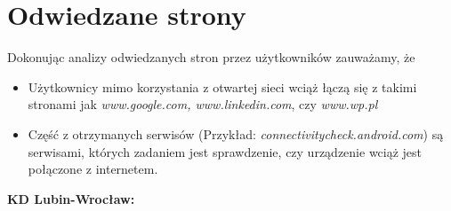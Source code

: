 \documentclass[12pt,a4paper]{article}
\begin{document}
    \section{Odwiedzane strony}
        Dokonując analizy odwiedzanych stron przez użytkowników zauważamy, że
            \begin{itemize}
                \item Użytkownicy mimo korzystania z otwartej sieci wciąż łączą się z takimi stronami jak \textit{www.google.com, www.linkedin.com}, czy \textit{www.wp.pl}
                \item Część z otrzymanych serwisów (Przykład: \textit{connectivitycheck.android.com}) są serwisami, których zadaniem jest sprawdzenie, czy urządzenie wciąż jest połączone z internetem.
            \end{itemize}
        \textbf{KD Lubin-Wrocław:}\\
\end{document}
